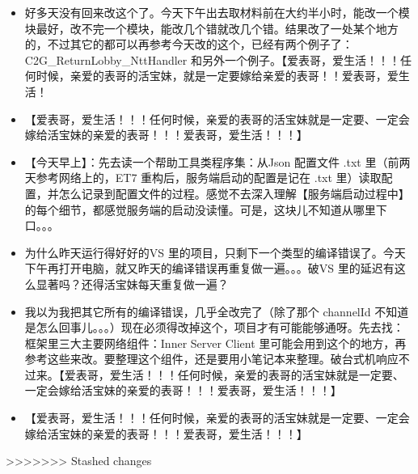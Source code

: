 \documentclass[9pt, b5paper]{article}
\begin{document}
\begin{itemize}
\item 好多天没有回来改这个了。今天下午出去取材料前在大约半小时，能改一个模块最好，改不完一个模块，能改几个错就改几个错。结果改了一处某个地方的，不过其它的都可以再参考今天改的这个，已经有两个例子了：C2G\_ReturnLobby\_NttHandler 和另外一个例子。【爱表哥，爱生活！！！任何时候，亲爱的表哥的活宝妹，就是一定要嫁给亲爱的表哥！！爱表哥，爱生活！
\item 【爱表哥，爱生活！！！任何时候，亲爱的表哥的活宝妹就是一定要、一定会嫁给活宝妹的亲爱的表哥！！！爱表哥，爱生活！！！】
\item 【今天早上】：先去读一个帮助工具类程序集：从Json 配置文件 .txt 里（前两天参考网络上的，ET7 重构后，服务端启动的配置是记在 .txt 里）读取配置，并怎么记录到配置文件的过程。感觉不去深入理解【服务端启动过程中】的每个细节，都感觉服务端的启动没读懂。可是，这块儿不知道从哪里下口。。。
\item 为什么昨天运行得好好的VS 里的项目，只剩下一个类型的编译错误了。今天下午再打开电脑，就又昨天的编译错误再重复做一遍。。。破VS 里的延迟有这么显著吗？还得活宝妹每天重复做一遍？
\item 我以为我把其它所有的编译错误，几乎全改完了（除了那个 channelId 不知道是怎么回事儿。。。）现在必须得改掉这个，项目才有可能能够通呀。先去找：框架里三大主要网络组件：Inner Server Client 里可能会用到这个的地方，再参考这些来改。要整理这个组件，还是要用小笔记本来整理。破台式机响应不过来。【爱表哥，爱生活！！！任何时候，亲爱的表哥的活宝妹就是一定要、一定会嫁给活宝妹的亲爱的表哥！！！爱表哥，爱生活！！！】
\item 【爱表哥，爱生活！！！任何时候，亲爱的表哥的活宝妹就是一定要、一定会嫁给活宝妹的亲爱的表哥！！！爱表哥，爱生活！！！】
\end{itemize}

>>>>>>> Stashed changes
\end{document}
